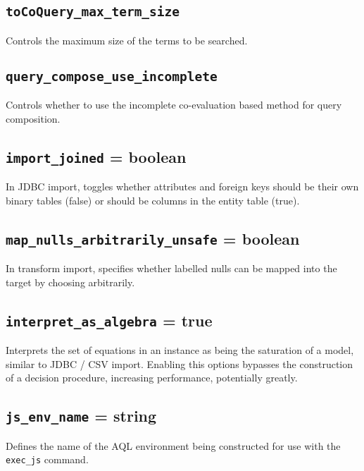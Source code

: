 \documentclass[10pt]{book}
\begin{document}
\subsection{{\tt toCoQuery\_max\_term\_size}}

Controls the maximum size of the terms to be searched. 

\subsection{{\tt query\_compose\_use\_incomplete}}

Controls whether to use the incomplete co-evaluation based method for query composition.

\subsection{{\tt import\_joined} = boolean} 

In JDBC import, toggles whether attributes and foreign keys should be their own binary tables (false) or should be columns in the entity table (true).

\subsection{{\tt map\_nulls\_arbitrarily\_unsafe} = boolean}

In transform import, specifies whether labelled nulls can be mapped into the target by choosing arbitrarily.

\subsection{{\tt interpret\_as\_algebra} = true}

Interprets the set of equations in an instance as being the saturation of a model, similar to JDBC / CSV import.  Enabling this options bypasses the construction of a decision procedure, increasing performance, potentially greatly.

\subsection{{\tt js\_env\_name} = string}

Defines the name of the AQL environment being constructed for use with the {\tt exec\_js} command.
\end{document}
